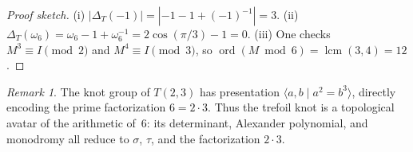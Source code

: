 \documentclass[11pt]{amsart}
\theoremstyle{remark}
\newtheorem*{remark}{Remark}
\begin{document}
\begin{proof}[Proof sketch]
(i) $|\Delta_T(-1)| = |{-1} - 1 + ({-1})^{-1}| = 3$.
(ii) $\Delta_T(\omega_6) = \omega_6 - 1 + \omega_6^{-1}
     = 2\cos(\pi/3) - 1 = 0$.
(iii) One checks $M^3 \equiv I \pmod{2}$ and $M^4 \equiv I \pmod{3}$,
so $\operatorname{ord}(M \bmod 6) = \operatorname{lcm}(3,4) = 12$.
\end{proof}

\begin{remark}
The knot group of $T(2,3)$ has presentation $\langle a, b \mid a^2 = b^3 \rangle$,
directly encoding the prime factorization $6 = 2 \cdot 3$.
Thus the trefoil knot is a topological avatar of the arithmetic of~$6$:
its determinant, Alexander polynomial, and monodromy all reduce to
$\sigma$, $\tau$, and the factorization $2 \cdot 3$.
\end{remark}
\end{document}
